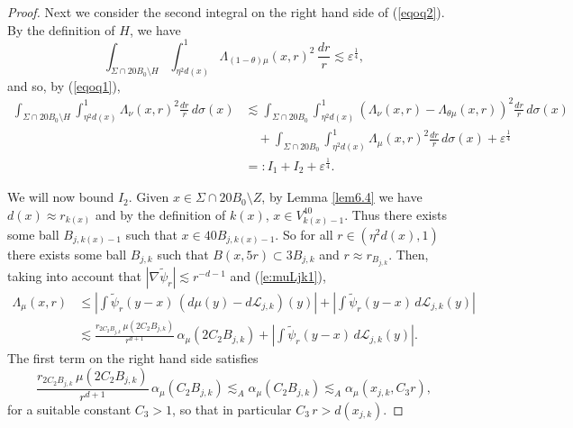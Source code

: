 \documentclass[11pt]{amsart}
\newcommand{\LL}{{\mathcal L}}
\newcommand{\rf}[1]{{(\ref{#1})}}
\newcommand{\ve}{{\varepsilon}}
\newcommand{\wt}[1]{{\widetilde{#1}}}
\theoremstyle{definition}
\theoremstyle{remark}
\numberwithin{equation}{section}
\newcommand{\av}[1]{\left| #1 \right|}
\begin{document}
\begin{proof}
Next we consider the second integral on the right hand side of \rf{eqoq2}. By the
definition of $H$, we have
$$\int_{\Sigma \cap 20 B_{0}\setminus H}
\int_{\eta^2 d(x)}^{1} \!\Lambda_{(1-\theta) \mu}(x,r)^{2} \, \frac{dr}{r}\lesssim \ve^{\frac14},$$
and so, by  \rf{eqoq1}, 
\begin{align}\label{eqoq3}
 \int_{\Sigma \cap 20 B_{0}\setminus H}\int_{\eta^2 d(x) }^{1}   \Lambda_{\nu}(x,r)^{2}\frac{dr}{r}\,d\sigma(x) 
&  \lesssim  \int_{\Sigma \cap 20 B_0} \int_{\eta^2 d(x)}^{1} \!(\Lambda_{\nu}(x,r)-  \Lambda_{\theta \mu}(x,r))^{2}\frac{dr}{r}\,d\sigma(x) \\
&\quad
+ \int_{\Sigma \cap 20 B_0}\int_{\eta^2 d(x)}^{1} \!\Lambda_{ \mu}(x,r)^{2}\frac{dr}{r}\,d\sigma(x) + \ve^{\frac14}\nonumber\\
& =: I_1 + I_2 + \ve^{\frac14}.\nonumber
\end{align}


We will now bound $I_2$.  Given $x\in\Sigma \cap 20 B_{0}
\setminus Z$, by Lemma \ref{lem6.4} we have
$d(x)\approx r_{k(x)}$ and by the definition of $k(x)$, $x\in V_{k(x)-1}^{40}$.
Thus there exists some ball $B_{j,k(x)-1}$ such that $x\in 40B_{j,k(x)-1}$.
So for all $r\in(\eta^2 d(x),1)$ there exists some ball $B_{j,k}$ such that
$B(x,5r)\subset 3B_{j,k}$ and  $r\approx r_{B_{j,k}}$. 
Then,
taking into account that $|\nabla \wt\psi_r|\lesssim r^{-d-1}$ and \rf{e:muLjk1},
\begin{align}
\label{e:L<a}
\Lambda_{\mu}(x,r) &
\leq  \av{\int \wt{\psi}_{r}(y-x) \,(d\mu(y)-d \LL_{j,k})(y)}
 + \av{\int \wt{\psi}_{r}(y-x) \, d\LL_{j,k}(y)}\\
&\lesssim \frac{r_{2C_2B_{j,k}}\,\mu(2C_2B_{j,k})}{r^{d+1}}\,\alpha_{\mu}(2C_2B_{j,k}) + \av{\int \wt{\psi}_{r}(y-x) \, d\LL_{j,k}(y)}.\nonumber
\end{align}
The first term on the right hand side satisfies
$$\frac{r_{2C_2B_{j,k}}\,\mu(2C_2B_{j,k})}{r^{d+1}}\,\alpha_{\mu}(C_2B_{j,k})\lesssim_A \alpha_{\mu}(C_2B_{j,k})\lesssim_A \alpha_{\mu}(x_{j,k},C_3r),$$
for a suitable constant $C_3>1$, so that in particular $C_3\,r> d(x_{j,k})$.


\end{proof}
\end{document}

